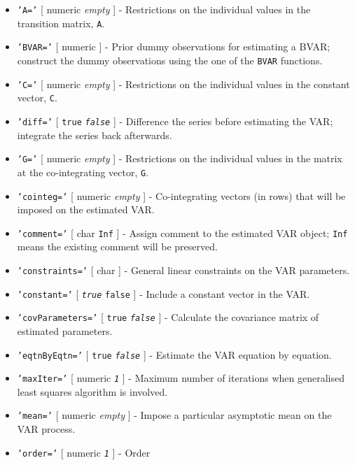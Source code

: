 \begin{itemize}
\item
  \texttt{'A='} {[} numeric \textbar{} \emph{empty} {]} - Restrictions
  on the individual values in the transition matrix, \texttt{A}.
\item
  \texttt{'BVAR='} {[} numeric {]} - Prior dummy observations for
  estimating a BVAR; construct the dummy observations using the one of
  the \texttt{BVAR} functions.
\item
  \texttt{'C='} {[} numeric \textbar{} \emph{empty} {]} - Restrictions
  on the individual values in the constant vector, \texttt{C}.
\item
  \texttt{'diff='} {[} \texttt{true} \textbar{} \emph{\texttt{false}}
  {]} - Difference the series before estimating the VAR; integrate the
  series back afterwards.
\item
  \texttt{'G='} {[} numeric \textbar{} \emph{empty} {]} - Restrictions
  on the individual values in the matrix at the co-integrating vector,
  \texttt{G}.
\item
  \texttt{'cointeg='} {[} numeric \textbar{} \emph{empty} {]} -
  Co-integrating vectors (in rows) that will be imposed on the estimated
  VAR.
\item
  \texttt{'comment='} {[} char \textbar{} \texttt{Inf} {]} - Assign
  comment to the estimated VAR object; \texttt{Inf} means the existing
  comment will be preserved.
\item
  \texttt{'constraints='} {[} char {]} - General linear constraints on
  the VAR parameters.
\item
  \texttt{'constant='} {[} \emph{\texttt{true}} \textbar{}
  \texttt{false} {]} - Include a constant vector in the VAR.
\item
  \texttt{'covParameters='} {[} \texttt{true} \textbar{}
  \emph{\texttt{false}} {]} - Calculate the covariance matrix of
  estimated parameters.
\item
  \texttt{'eqtnByEqtn='} {[} \texttt{true} \textbar{}
  \emph{\texttt{false}} {]} - Estimate the VAR equation by equation.
\item
  \texttt{'maxIter='} {[} numeric \textbar{} \emph{\texttt{1}} {]} -
  Maximum number of iterations when generalised least squares algorithm
  is involved.
\item
  \texttt{'mean='} {[} numeric \textbar{} \emph{empty} {]} - Impose a
  particular asymptotic mean on the VAR process.
\item
  \texttt{'order='} {[} numeric \textbar{} \emph{\texttt{1}} {]} - Order

\end{itemize}
